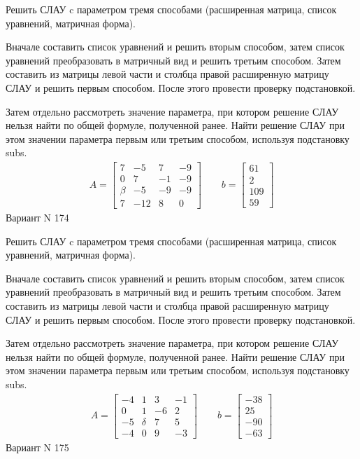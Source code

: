 \documentclass[11pt]{report}
\begin{document}
Решить СЛАУ c параметром тремя способами (расширенная матрица, список уравнений, матричная форма).

Вначале составить список уравнений и решить вторым способом,
затем список уравнений преобразовать в матричный вид и решить третьим способом.
Затем составить из матрицы левой части и столбца правой расширенную матрицу СЛАУ и решить первым способом.
После этого провести проверку подстановкой.

Затем отдельно рассмотреть значение параметра, при котором решение СЛАУ нельзя найти по общей формуле,
полученной ранее.
Найти решение СЛАУ при этом значении параметра первым или третьим способом, используя подстановку subs.
\begin{align*}
    A = \left[\begin{matrix}7 & -5 & 7 & -9\\0 & 7 & -1 & -9\\\beta & -5 & -9 & -9\\7 & -12 & 8 & 0\end{matrix}\right]
\qquad b = \left[\begin{matrix}61\\2\\109\\59\end{matrix}\right]
\end{align*}
\newpage
Вариант N 174


Решить СЛАУ c параметром тремя способами (расширенная матрица, список уравнений, матричная форма).

Вначале составить список уравнений и решить вторым способом,
затем список уравнений преобразовать в матричный вид и решить третьим способом.
Затем составить из матрицы левой части и столбца правой расширенную матрицу СЛАУ и решить первым способом.
После этого провести проверку подстановкой.

Затем отдельно рассмотреть значение параметра, при котором решение СЛАУ нельзя найти по общей формуле,
полученной ранее.
Найти решение СЛАУ при этом значении параметра первым или третьим способом, используя подстановку subs.
\begin{align*}
    A = \left[\begin{matrix}-4 & 1 & 3 & -1\\0 & 1 & -6 & 2\\-5 & \delta & 7 & 5\\-4 & 0 & 9 & -3\end{matrix}\right]
\qquad b = \left[\begin{matrix}-38\\25\\-90\\-63\end{matrix}\right]
\end{align*}
\newpage
Вариант N 175
\end{document}
